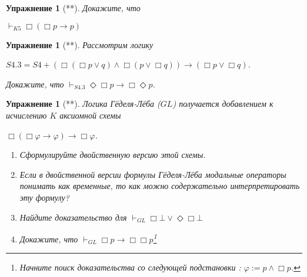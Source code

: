 \documentclass[11pt]{article}
\newtheorem{exercise}[theorem]{Упражнение}
\begin{document}
\begin{exercise}[**]
Докажите, что 
\begin{center}
$ \vdash_{K5} \Box (\Box p \to p)$
\end{center}
\end{exercise}


\begin{exercise}[**]
Рассмотрим логику 
\begin{center}
$S4.3 = S4 + (\Box (\Box p \vee q) \wedge \Box (p\vee \Box q)) \to (\Box p \vee \Box q) $.	
\end{center}

 Докажите, что 
$\vdash_{S4.3} \Diamond \Box p \to \Box \Diamond p$.
\end{exercise}

\begin{exercise}[**] Логика Гёделя-Лёба ($GL$) получается добавлением к исчислению $K$ аксиомной схемы 

\begin{center}
$\Box (\Box \varphi \to \varphi) \to \Box \varphi$.	
\end{center}

\begin{enumerate}
	\item Сформулируйте двойственную версию этой схемы.
    \item Если в двойственной версии формулы Гёделя-Лёба модальные операторы понимать как временные, то как можно содержательно интерпретировать эту формулу?
    \item Найдите доказательство для $\vdash_{GL} \Box \bot \vee \Diamond \Box \bot$
    \item Докажите, что  $\vdash_{GL} \Box p \to \Box \Box p$\footnote{Начните поиск доказательства со следующей подстановки : $\varphi:= p \wedge \Box p$.}
\end{enumerate}
\end{exercise}


\end{document}
